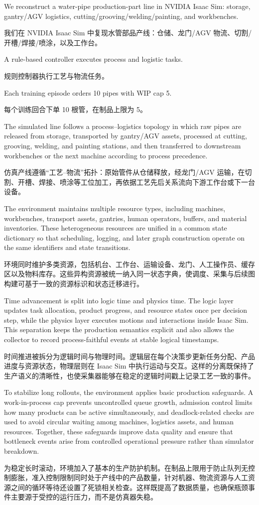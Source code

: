 \documentclass[12pt,a4paper,oneside,scheme=plain]{ctexrep}
\newcommand{\bip}[2]{%
  \par #1\par
  \nobreak\vspace{0.12em}%
  {\small\color{black!62}#2}\par
  \vspace{0.62em}%
}
\begin{document}
\bip
{We reconstruct a water-pipe production-part line in NVIDIA Isaac Sim: storage, gantry/AGV logistics, cutting/grooving/welding/painting, and workbenches.}
{我们在 NVIDIA Isaac Sim 中复现水管部品产线：仓储、龙门/AGV 物流、切割/开槽/焊接/喷涂，以及工作台。}

\bip
{A rule-based controller executes process and logistic tasks.}
{规则控制器执行工艺与物流任务。}

\bip
{Each training episode orders 10 pipes with WIP cap 5.}
{每个训练回合下单 10 根管，在制品上限为 5。}


\bip
{The simulated line follows a process--logistics topology in which raw pipes are released from storage, transported by gantry/AGV assets, processed at cutting, grooving, welding, and painting stations, and then transferred to downstream workbenches or the next machine according to process precedence.}
{仿真产线遵循“工艺--物流”拓扑：原始管件从仓储释放，经龙门/AGV 运输，在切割、开槽、焊接、喷涂等工位加工，再依据工艺先后关系流向下游工作台或下一台设备。}

\bip
{The environment maintains multiple resource types, including machines, workbenches, transport assets, gantries, human operators, buffers, and material inventories. These heterogeneous resources are unified in a common state dictionary so that scheduling, logging, and later graph construction operate on the same identifiers and state transitions.}
{环境同时维护多类资源，包括机台、工作台、运输设备、龙门、人工操作员、缓存区以及物料库存。这些异构资源被统一纳入同一状态字典，使调度、采集与后续图构建可基于一致的资源标识和状态迁移进行。}

\bip
{Time advancement is split into logic time and physics time. The logic layer updates task allocation, product progress, and resource states once per decision step, while the physics layer executes motions and interactions inside Isaac Sim. This separation keeps the production semantics explicit and also allows the collector to record process-faithful events at stable logical timestamps.}
{时间推进被拆分为逻辑时间与物理时间。逻辑层在每个决策步更新任务分配、产品进度与资源状态，物理层则在 Isaac Sim 中执行运动与交互。这样的分离既保持了生产语义的清晰性，也使采集器能够在稳定的逻辑时间戳上记录工艺一致的事件。}

\bip
{To stabilize long rollouts, the environment applies basic production safeguards. A work-in-process cap prevents uncontrolled queue growth, admission control limits how many products can be active simultaneously, and deadlock-related checks are used to avoid circular waiting among machines, logistics assets, and human resources. Together, these safeguards improve data quality and ensure that bottleneck events arise from controlled operational pressure rather than simulator breakdown.}
{为稳定长时滚动，环境加入了基本的生产防护机制。在制品上限用于防止队列无控制膨胀，准入控制限制同时处于产线中的产品数量，针对机器、物流资源与人工资源之间的循环等待还设置了死锁相关检查。这样既提高了数据质量，也确保瓶颈事件主要源于受控的运行压力，而不是仿真器失稳。}
\end{document}
